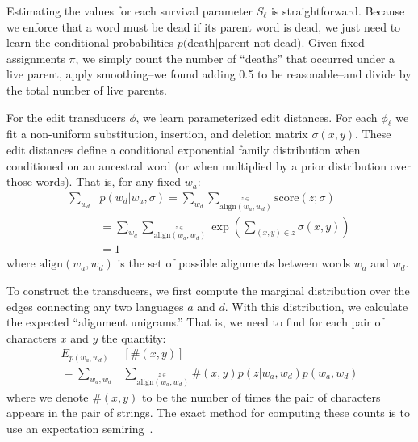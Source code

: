 \documentclass[11pt,a4paper]{article}
\begin{document}
Estimating the values for each survival parameter $S_\ell$ is
straightforward. Because we enforce that a word must be dead if its
parent word is dead, we just need to learn the conditional probabilities
$p($death$|$parent not dead$)$. Given fixed assignments $\pi$, we
simply count the number of ``deaths'' that occurred under a live
parent, apply smoothing--we found adding 0.5 to be reasonable--and
divide by the total number of live parents.

For the edit transducers $\phi$, we learn parameterized edit distances.  For each $\phi_\ell$ we fit a non-uniform
substitution, insertion, and deletion matrix $\sigma(x,y)$. These edit distances
define a conditional exponential family distribution when conditioned
on an ancestral word (or when multiplied by a prior distribution
over those words). That is, for any fixed $w_a$:
\begin{equation*}
  \begin{split}
    \sum_{w_d} &p(w_d|w_a,\sigma) = \sum_{w_d} \sum_{\stackrel{z\in}{\scriptscriptstyle\mathrm{align}(w_a,w_d)}} \mathrm{score}(z;\sigma) \\
    &= \sum_{w_d} \sum_{\stackrel{z\in}{\scriptscriptstyle\mathrm{align}(w_a,w_d)}} \exp( \sum_{(x,y)\in z} \sigma(x,y)) \\
     &= 1
   \end{split}
 \end{equation*}
where $\mathrm{align}(w_a,w_d)$ is the set of possible alignments between words $w_a$ and $w_d$.

To construct the transducers, we first compute the marginal
distribution over the edges connecting any two languages $a$ and
$d$. With this distribution, we calculate the expected ``alignment
unigrams.'' That is, we need to find for each pair of characters
$x$ and $y$ the quantity:
\begin{equation*}
  \begin{split}
    E_{p(w_a,w_d)}&[\#(x,y)] \\ = \sum_{w_a,w_d} &\sum_{\stackrel{z\in}{\scriptscriptstyle\mathrm{align}(w_a,w_d)}} \#(x,y) p(z|w_a,w_d)p(w_a,w_d)
   \end{split}
 \end{equation*}
where we denote $\#(x,y)$ to be the number of times the pair of characters
appears in the pair of strings. The exact method for computing
these counts is to use an expectation semiring~\cite{eisner2001expectation}.
\end{document}
